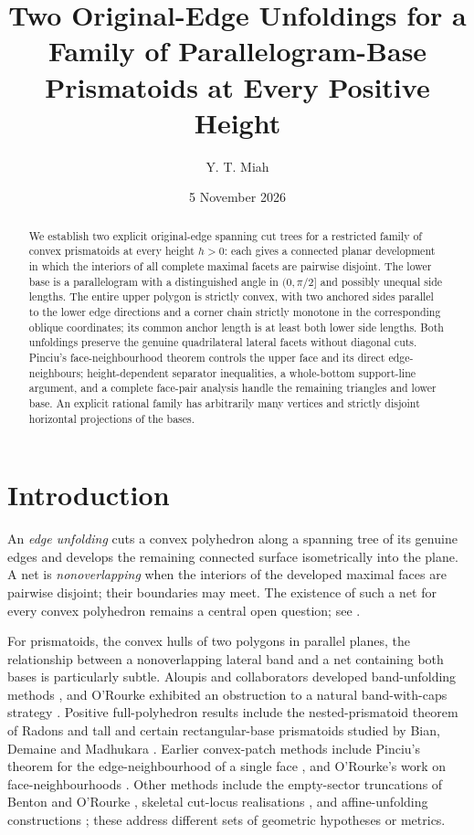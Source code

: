 \documentclass[11pt]{amsart}
\title[Two unfoldings of a parallelogram-base prismatoid family]{Two Original-Edge Unfoldings for a Family of Parallelogram-Base Prismatoids at Every Positive Height}
\author{Y. T. Miah}
\date{5 November 2026}
\begin{document}
\begin{abstract}
We establish two explicit original-edge spanning cut trees for a restricted family of convex prismatoids at every height \(h>0\): each gives a connected planar development in which the interiors of all complete maximal facets are pairwise disjoint. The lower base is a parallelogram with a distinguished angle in \((0,\pi/2]\) and possibly unequal side lengths. The entire upper polygon is strictly convex, with two anchored sides parallel to the lower edge directions and a corner chain strictly monotone in the corresponding oblique coordinates; its common anchor length is at least both lower side lengths. Both unfoldings preserve the genuine quadrilateral lateral facets without diagonal cuts. Pinciu's face-neighbourhood theorem controls the upper face and its direct edge-neighbours; height-dependent separator inequalities, a whole-bottom support-line argument, and a complete face-pair analysis handle the remaining triangles and lower base. An explicit rational family has arbitrarily many vertices and strictly disjoint horizontal projections of the bases.
\end{abstract}
\maketitle

\section{Introduction}
An \emph{edge unfolding} cuts a convex polyhedron along a spanning tree of its genuine edges and develops the remaining connected surface isometrically into the plane. A net is \emph{nonoverlapping} when the interiors of the developed maximal faces are pairwise disjoint; their boundaries may meet. The existence of such a net for every convex polyhedron remains a central open question; see \cite{demaine_orourke_book}.

For prismatoids, the convex hulls of two polygons in parallel planes, the relationship between a nonoverlapping lateral band and a net containing both bases is particularly subtle. Aloupis and collaborators developed band-unfolding methods \cite{aloupis2008}, and O'Rourke exhibited an obstruction to a natural band-with-caps strategy \cite{orourke2007band}. Positive full-polyhedron results include the nested-prismatoid theorem of Radons \cite{radons2024} and tall and certain rectangular-base prismatoids studied by Bian, Demaine and Madhukara \cite{bian2021}. Earlier convex-patch methods include Pinciu's theorem for the edge-neighbourhood of a single face \cite[Theorem~1]{pinciu2007}, and O'Rourke's work on face-neighbourhoods \cite{orourke2013}. Other methods include the empty-sector truncations of Benton and O'Rourke \cite{benton2007}, skeletal cut-locus realisations \cite{orourke_vilcu2025}, and affine-unfolding constructions \cite{ghomi2014}; these address different sets of geometric hypotheses or metrics.
\end{document}
